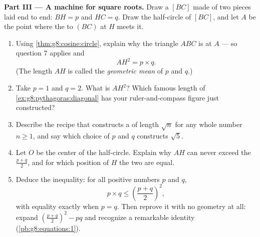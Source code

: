 \begin{problem}[{Weekend problem --- the altitude of a right
triangle: $AB^2 = BH \times BC$, $AH^2 = BH \times HC$, a second
proof of Pythagoras, and a machine for constructing square roots}]
\medskip
\noindent\textbf{Part III --- A machine for square roots.}
Draw a  $[BC]$ made of two pieces laid end to end:
$BH = p$ and $HC = q$. Draw the half-circle of  $[BC]$,
and let $A$ be the point where the  to $(BC)$ at $H$
meets it.
\begin{enumerate}[resume]
  \item Using \cref{thm:g8:cosine:circle}, explain why the
        triangle $ABC$ is  at $A$ --- so question 7
        applies and
        \[
        AH^2 = p \times q .
        \]
        (The length $AH$ is called the \emph{geometric
        mean} of $p$ and $q$.)
  \item Take $p = 1$ and $q = 2$. What is $AH^2$? Which famous
        length of \cref{ex:g8:pythagoras:diagonal} has your
        ruler-and-compass figure just constructed?
  \item Describe the recipe that constructs a  of length
        $\sqrt n$ for any whole number $n \geq 1$, and say which
        choice of $p$ and $q$ constructs $\sqrt 5$.
  \item Let $O$ be the center of the half-circle. Explain why
        $AH$ can never exceed the  $\frac{p + q}{2}$, and
        for which position of $H$ the two are equal.
  \item Deduce the inequality: for all positive numbers $p$ and
        $q$,
        \[
        p \times q \leq \left(\frac{p + q}{2}\right)^2,
        \]
        with equality exactly when $p = q$. Then reprove it with
        no geometry at all: expand
        $\left(\frac{p+q}{2}\right)^2 - p q$ and recognize a
        remarkable identity (\cref{pb:g8:equations:1}).
\end{enumerate}
\end{problem}
